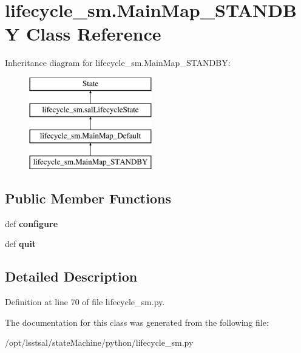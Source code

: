 \hypertarget{classlifecycle__sm_1_1_main_map___s_t_a_n_d_b_y}{\section{lifecycle\-\_\-sm.\-Main\-Map\-\_\-\-S\-T\-A\-N\-D\-B\-Y Class Reference}
\label{classlifecycle__sm_1_1_main_map___s_t_a_n_d_b_y}
}
Inheritance diagram for lifecycle\-\_\-sm.\-Main\-Map\-\_\-\-S\-T\-A\-N\-D\-B\-Y\-:\begin{figure}[H]
\begin{center}
\leavevmode
\includegraphics[height=4.000000cm]{classlifecycle__sm_1_1_main_map___s_t_a_n_d_b_y}
\end{center}
\end{figure}
\subsection*{Public Member Functions}
\begin{DoxyCompactItemize}
\item 
\hypertarget{classlifecycle__sm_1_1_main_map___s_t_a_n_d_b_y_a59ea858592fe2524e7ab387d0a64041d}{def {\bfseries configure}}\label{classlifecycle__sm_1_1_main_map___s_t_a_n_d_b_y_a59ea858592fe2524e7ab387d0a64041d}

\item 
\hypertarget{classlifecycle__sm_1_1_main_map___s_t_a_n_d_b_y_a81da787545fb2ad06951b2df6d94a397}{def {\bfseries quit}}\label{classlifecycle__sm_1_1_main_map___s_t_a_n_d_b_y_a81da787545fb2ad06951b2df6d94a397}

\end{DoxyCompactItemize}


\subsection{Detailed Description}


Definition at line 70 of file lifecycle\-\_\-sm.\-py.



The documentation for this class was generated from the following file\-:\begin{DoxyCompactItemize}
\item 
/opt/lsstsal/state\-Machine/python/lifecycle\-\_\-sm.\-py\end{DoxyCompactItemize}
